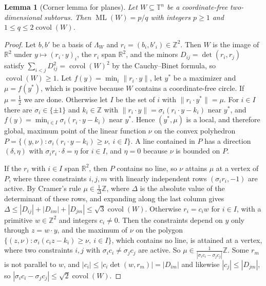 \documentclass[12pt]{amsart}
\newtheorem{lemma}[theorem]{Lemma}
\theoremstyle{definition}\newtheorem{definition}[theorem]{Definition}
\theoremstyle{remark}\newtheorem{remark}[theorem]{Remark}
\newcommand{\Z}{\mathbb Z}\newcommand{\R}{\mathbb R}\newcommand{\T}{\mathbb T}
\newcommand{\norm}[1]{\lVert #1\rVert}
\newcommand{\ML}{\operatorname{ML}}
\newcommand{\covol}{\operatorname{covol}}
\begin{document}
\begin{lemma}[Corner lemma for planes]\label{lem:corner2}
Let $W\subseteq\T^n$ be a coordinate-free two-dimensional subtorus. Then $\ML(W)=p/q$ with integers $p\ge1$ and $1\le q\le2\covol(W)$.
\end{lemma}
\begin{proof}
Let $b,b'$ be a basis of $\Lambda_W$ and $r_i=(b_i,b'_i)\in\Z^2$. Then $W$ is the image of $\R^2$ under $y\mapsto(r_i\cdot y)_i$, the $r_i$ span $\R^2$, and the minors $D_{ij}=\det(r_i,r_j)$ satisfy $\sum_{i<j}D_{ij}^2=\covol(W)^2$ by the Cauchy--Binet formula, so $\covol(W)\ge1$. Let $f(y)=\min_i\norm{r_i\cdot y}$, let $y^*$ be a maximizer and $\mu=f(y^*)$, which is positive because $W$ contains a coordinate-free circle. If $\mu=\frac12$ we are done. Otherwise let $I$ be the set of $i$ with $\norm{r_i\cdot y^*}=\mu$. For $i\in I$ there are $\sigma_i\in\{\pm1\}$ and $k_i\in\Z$ with $\norm{r_i\cdot y}=\sigma_i(r_i\cdot y-k_i)$ near $y^*$, and $f(y)=\min_{i\in I}\sigma_i(r_i\cdot y-k_i)$ near $y^*$. Hence $(y^*,\mu)$ is a local, and therefore global, maximum point of the linear function $\nu$ on the convex polyhedron $P=\{(y,\nu):\sigma_i(r_i\cdot y-k_i)\ge\nu,\ i\in I\}$. A line contained in $P$ has a direction $(\delta,\eta)$ with $\sigma_ir_i\cdot\delta=\eta$ for $i\in I$, and $\eta=0$ because $\nu$ is bounded on $P$.

If the $r_i$ with $i\in I$ span $\R^2$, then $P$ contains no line, so $\nu$ attains $\mu$ at a vertex of $P$, where three constraints $i,j,m$ with linearly independent rows $(\sigma_ir_i,-1)$ are active. By Cramer's rule $\mu\in\frac1\Delta\Z$, where $\Delta$ is the absolute value of the determinant of these rows, and expanding along the last column gives $\Delta\le|D_{ij}|+|D_{im}|+|D_{jm}|\le\sqrt3\covol(W)$. Otherwise $r_i=c_iw$ for $i\in I$, with a primitive $w\in\Z^2$ and integers $c_i\ne0$. Then the constraints depend on $y$ only through $z=w\cdot y$, and the maximum of $\nu$ on the polygon $\{(z,\nu):\sigma_i(c_iz-k_i)\ge\nu,\ i\in I\}$, which contains no line, is attained at a vertex, where two constraints $i,j$ with $\sigma_ic_i\ne\sigma_jc_j$ are active. So $\mu\in\frac1{|\sigma_ic_i-\sigma_jc_j|}\Z$. Some $r_m$ is not parallel to $w$, and $|c_i|\le|c_i\det(w,r_m)|=|D_{im}|$ and likewise $|c_j|\le|D_{jm}|$, so $|\sigma_ic_i-\sigma_jc_j|\le\sqrt2\covol(W)$.
\end{proof}
\end{document}
